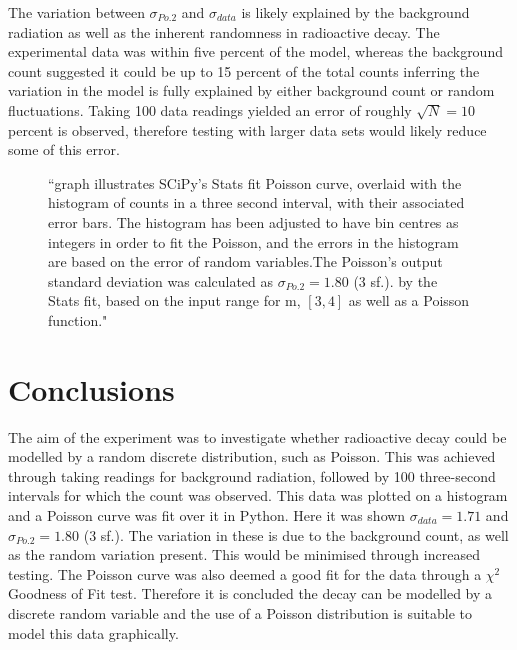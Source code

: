 \documentclass[11pt]{article}
\begin{document}
\noindent The variation between $\sigma_{Po.2}$ and $\sigma_{data}$ is likely explained by the background radiation as well as the inherent randomness in radioactive decay. The experimental data was within five percent of the model, whereas the background count suggested it could be up to 15 percent of the total counts inferring the variation in the model is fully explained by either background count or random fluctuations. Taking 100 data readings yielded an error of roughly $\sqrt{N} = 10$ percent is observed, therefore testing with larger data sets would likely reduce some of this error.  
\begin{figure}[h]
        \begin{center}
            \def\svgwidth{\columnwidth}
            
             \caption{“graph illustrates SCiPy's Stats fit Poisson curve, overlaid with the histogram of counts in a three second interval, with their associated error bars. The histogram has been adjusted to have bin centres as integers in order to fit the Poisson, and the errors in the histogram are based on the error of random variables.The Poisson's output standard deviation was calculated as $\sigma_{Po.2} = 1.80$ (3 sf.). by the Stats fit,  based on the input range for m, $[3,4]$ as well as a Poisson function."}
             \label{fig:experimental results 1}
        \end{center}
    \end{figure}
    \section{Conclusions}
The aim of the experiment was to investigate whether radioactive decay could be modelled by a random discrete distribution, such as Poisson. This was achieved through taking readings for background radiation, followed by 100 three-second intervals for which the count was observed. This data was plotted on a histogram and a Poisson curve was fit over it in Python. Here it was shown $\sigma_{data} = 1.71$ and $\sigma_{Po.2} = 1.80$ (3 sf.). The variation in these is due to the background count, as well as the random variation present. This would be minimised through increased testing. The Poisson curve was also deemed a good fit for the data through a $\chi^{2}$ Goodness of Fit test. Therefore it is  concluded the decay can be modelled by a discrete random variable and the use of a Poisson distribution is suitable to model this data graphically.
\end{document}
